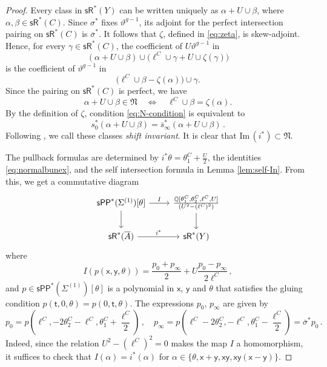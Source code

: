 \documentclass[11pt]{article}
\def\QQ{\mathbb{Q}}
\def\sR{\mathsf{sR}}
\def\im{\mathrm{Im}\,}
\newcommand{\barA}{\overline{A}}
\newcommand{\sh}{\sigma}
\newcommand{\shb}{\overline{\sh}}
\newcommand{\sPP}{\mathsf{sPP}}
\theoremstyle{definition}
\begin{document}
\begin{proof}
    Every class in $\sR^*(Y)$ can be written uniquely as
    $\alpha+U\cup \beta$, where $\alpha,\beta\in\sR^*(C)$. Since $\sh^*$ fixes
    $\vartheta^{g-1}$, its adjoint for the perfect intersection pairing on
    $\sR^*(C)$ is $\shb^*$. It follows that $\zeta$, defined in \eqref{eq:zeta}, is skew-adjoint. Hence, for every $\gamma\in\sR^*(C)$,
    the coefficient of $U\vartheta^{g-1}$ in
    \[
    (\alpha+U\cup \beta)
    \cup\bigl(\ell^C\cup\gamma+U\cup\zeta(\gamma)\bigr)
    \]
    is the coefficient of $\vartheta^{g-1}$ in
    \[
    \bigl(\ell^C\cup\beta-\zeta(\alpha)\bigr)\cup\gamma.
    \]
    Since the pairing on $\sR^*(C)$ is perfect, we have
    \begin{equation}\label{eq:N-condition}
    \alpha+U\cup \beta\in\mathfrak N
    \quad\Longleftrightarrow\quad
    \ell^C\cup\beta=\zeta(\alpha).
    \end{equation}
    By the definition of $\zeta$, condition \eqref{eq:N-condition} is equivalent to
    \begin{equation}\label{eq:sft-inv}
        s_0^*(\alpha +U\cup \beta) = \overline{s}_\infty^*(\alpha+U\cup \beta)\,.
    \end{equation}
    Following \cite{GZ}, we call these classes \emph{shift invariant}. It is clear that $\im (i^*) \subset \mathfrak N$.

    The pullback formulas are determined by $i^*\theta = \theta_1^C + \frac{U}{2}$, the identities \eqref{eq:normalbunex}, and the self intersection formula in Lemma \ref{lem:self-In}. From this, we get a commutative diagram
    \[\begin{tikzcd}
	{\sPP^*(\Sigma^{(1)})[\theta]} & {\frac{\QQ[\theta_1^C, \theta_2^C, \ell^C, U]}{(U^2-(\ell^C)^2)}} \\
	{\sR^*(\barA)} & {\sR^*(Y)}
	\arrow["I", from=1-1, to=1-2]
	\arrow[from=1-1, to=2-1]
	\arrow[from=1-2, to=2-2]
	\arrow["{i^*}", from=2-1, to=2-2]
    \end{tikzcd}\]
    where
    $$
    I(p(\mathsf{x}, \mathsf{y}, \theta)) =  \frac{p_0 + p_{\infty}}{2} + U \frac{p_0-p_{\infty}}{2\ell^C}\, ,
    $$
    and $p \in \sPP^*(\Sigma^{(1)})[\theta]$ is a polynomial in $\mathsf{x}$, $\mathsf{y}$ and $\theta$ that satisfies the gluing condition $p(\mathsf{t}, 0, \theta) = p(0,\mathsf{t}, \theta)$. The expressions $p_0$, $p_\infty$ are given by
    $$
    p_0 = p \left(\ell^C, -2\theta_2^C -\ell^C, \theta_1^C + \frac{\ell^C}{2}\right)\, ,\quad p_\infty = p \left(\ell^C-2\theta_2^C, -\ell^C, \theta_1^C - \frac{\ell^C}{2}\right)= \shb^*p_0\,.
    $$
    Indeed, since the relation $U^2-(\ell^C)^2=0$ makes the map $I$ a homomorphism, it suffices to check that $I(\alpha)=i^*(\alpha)$ for $\alpha \in \{\theta, \mathsf{x}+\mathsf{y}, \mathsf{x}\mathsf{y}, \mathsf{x}\mathsf{y}(\mathsf{x}-\mathsf{y})\}$.


\end{proof}
\end{document}
